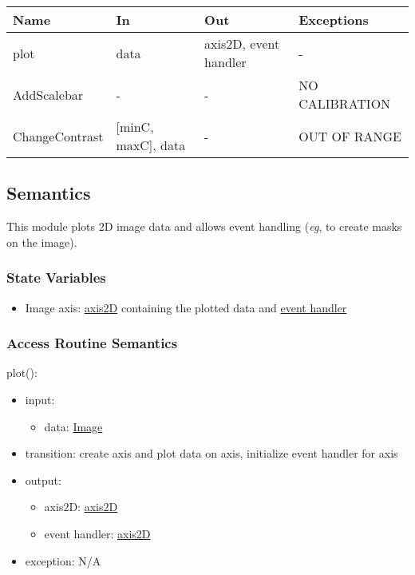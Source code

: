 \documentclass[12pt, titlepage]{article}
\begin{document}
\begin{center}
    \begin{tabular}{p{4cm} p{3cm} p{3cm} p{4cm}}
        \hline
        \textbf{Name} & \textbf{In} & \textbf{Out} & \textbf{Exceptions} \\
        \hline
        plot & data & axis2D, event handler & - \\
        AddScalebar & - & - & NO CALIBRATION \\
        ChangeContrast & [minC, maxC], data & - & OUT OF RANGE \\
        \hline
    \end{tabular}
\end{center}

\subsection{Semantics}
This module plots 2D image data and allows event handling (\textit{eg}, to
create masks on the image).

\subsubsection{State Variables}
\begin{itemize}
    \item Image axis: \hyperref[Mod:Plotting]{axis2D} containing the plotted
    data and \hyperref[Mod:Plotting]{event handler}
\end{itemize}

\subsubsection{Access Routine Semantics}

\noindent plot():
\begin{itemize}
    \item input:
    \begin{itemize}
        \item data: \hyperref[Mod:Image]{Image}
    \end{itemize}
    \item transition: create axis and plot data on axis, initialize event
    handler for axis
    \item output:
    \begin{itemize}
        \item axis2D: \hyperref[Mod:Plotting]{axis2D}
        \item event handler: \hyperref[Mod:Plotting]{axis2D}
    \end{itemize}
    \item exception: N/A
\end{itemize}
\end{document}
